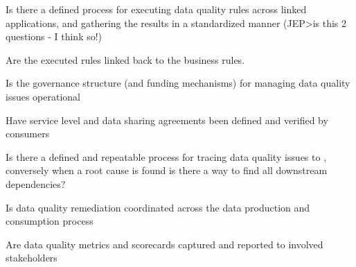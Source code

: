 \begin{core-questions}

  \item [\thesection.1] Is there a defined process for executing data quality rules across linked applications, and gathering the results in a standardized manner (JEP>is this 2 questions - I think so!)
  \item [\thesection.2] Are the executed rules linked back to the business rules.
  \item [\thesection.3] Is the governance structure (and funding mechanisms) for managing data quality issues operational
  \item [\thesection.4] Have service level and data sharing agreements been defined and verified by consumers
  \item [\thesection.5] Is there a defined and repeatable process for tracing data quality issues to , conversely when a root cause is found is there a way to find all downstream dependencies?
  \item [\thesection.6] Is data quality remediation coordinated across the data production and consumption process
  \item [\thesection.7] Are data quality metrics and scorecards captured and reported to involved stakeholders

\end{core-questions}

